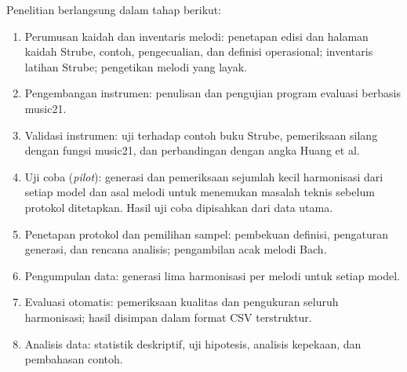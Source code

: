 Penelitian berlangsung dalam tahap berikut:

\begin{enumerate}
    \item Perumusan kaidah dan inventaris melodi: penetapan edisi dan halaman kaidah Strube, contoh, pengecualian, dan definisi operasional; inventaris latihan Strube; pengetikan melodi yang layak.
    \item Pengembangan instrumen: penulisan dan pengujian program evaluasi berbasis music21.
    \item Validasi instrumen: uji terhadap contoh buku Strube, pemeriksaan silang dengan fungsi music21, dan perbandingan dengan angka Huang et al.
    \item Uji coba (\textit{pilot}): generasi dan pemeriksaan sejumlah kecil harmonisasi dari setiap model dan asal melodi untuk menemukan masalah teknis sebelum protokol ditetapkan. Hasil uji coba dipisahkan dari data utama.
    \item Penetapan protokol dan pemilihan sampel: pembekuan definisi, pengaturan generasi, dan rencana analisis; pengambilan acak melodi Bach.
    \item Pengumpulan data: generasi lima harmonisasi per melodi untuk setiap model.
    \item Evaluasi otomatis: pemeriksaan kualitas dan pengukuran seluruh harmonisasi; hasil disimpan dalam format CSV terstruktur.
    \item Analisis data: statistik deskriptif, uji hipotesis, analisis kepekaan, dan pembahasan contoh.
\end{enumerate}

